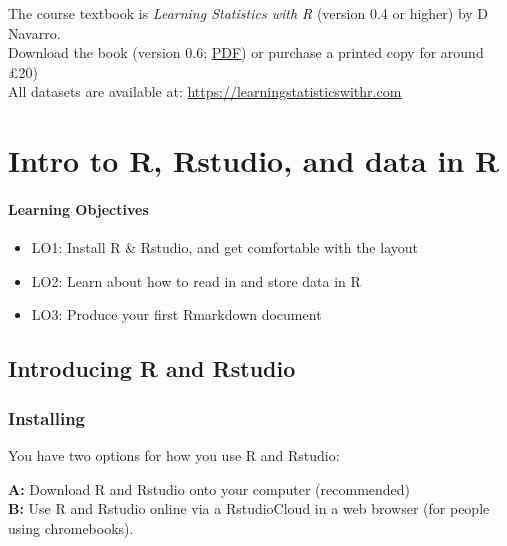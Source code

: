 \documentclass[]{book}
\providecommand{\tightlist}{%
  \setlength{\itemsep}{0pt}\setlength{\parskip}{0pt}}
\begin{document}
The course textbook is \emph{Learning Statistics with R} (version 0.4 or higher) by D Navarro.\\
Download the book (version 0.6; \href{https://learningstatisticswithr.com/lsr-0.6.pdf}{PDF}) or purchase a printed copy for around £20)\\
All datasets are available at: \url{https://learningstatisticswithr.com}

\hypertarget{chap-intro}{%
\chapter*{Intro to R, Rstudio, and data in R}\label{chap-intro}}

\hypertarget{learning-objectives}{%
\subsubsection*{Learning Objectives}\label{learning-objectives}}

\begin{itemize}
\tightlist
\item
  LO1: Install R \& Rstudio, and get comfortable with the layout\\
\item
  LO2: Learn about how to read in and store data in R
\item
  LO3: Produce your first Rmarkdown document\\
\end{itemize}

\hypertarget{introducing-r-and-rstudio}{%
\section{Introducing R and Rstudio}\label{introducing-r-and-rstudio}}

\hypertarget{installing}{%
\subsection*{Installing}\label{installing}}

You have two options for how you use R and Rstudio:

\textbf{A:} Download R and Rstudio onto your computer (recommended)\\
\textbf{B:} Use R and Rstudio online via a RstudioCloud in a web browser (for people using chromebooks).
\end{document}

